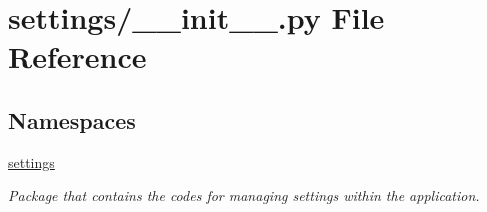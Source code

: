 \hypertarget{a00320}{}\section{settings/\+\_\+\+\_\+init\+\_\+\+\_\+.py File Reference}
\label{a00320}
\subsection*{Namespaces}
\begin{DoxyCompactItemize}
\item 
 \hyperlink{a00058}{settings}
\begin{DoxyCompactList}\small\item\em Package that contains the codes for managing settings within the application. \end{DoxyCompactList}\end{DoxyCompactItemize}
